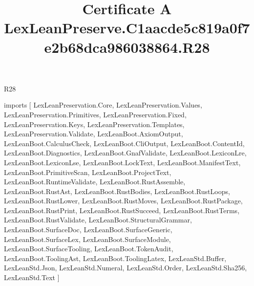 \begin{lexlean}{R28}
\title{Certificate A LexLeanPreserve.C1aacde5c819a0f7e2b68dca986038864.R28}
\begin{coremodule}
imports [
  LexLeanPreservation.Core,
  LexLeanPreservation.Values,
  LexLeanPreservation.Primitives,
  LexLeanPreservation.Fixed,
  LexLeanPreservation.Keys,
  LexLeanPreservation.Templates,
  LexLeanPreservation.Validate,
  LexLeanBoot.AxiomOutput,
  LexLeanBoot.CalculusCheck,
  LexLeanBoot.CliOutput,
  LexLeanBoot.ContentId,
  LexLeanBoot.Diagnostics,
  LexLeanBoot.GnafValidate,
  LexLeanBoot.LexiconLre,
  LexLeanBoot.LexiconLse,
  LexLeanBoot.LockText,
  LexLeanBoot.ManifestText,
  LexLeanBoot.PrimitiveScan,
  LexLeanBoot.ProjectText,
  LexLeanBoot.RuntimeValidate,
  LexLeanBoot.RustAssemble,
  LexLeanBoot.RustAst,
  LexLeanBoot.RustBodies,
  LexLeanBoot.RustLoops,
  LexLeanBoot.RustLower,
  LexLeanBoot.RustMoves,
  LexLeanBoot.RustPackage,
  LexLeanBoot.RustPrint,
  LexLeanBoot.RustSucceed,
  LexLeanBoot.RustTerms,
  LexLeanBoot.RustValidate,
  LexLeanBoot.StructuralGrammar,
  LexLeanBoot.SurfaceDoc,
  LexLeanBoot.SurfaceGeneric,
  LexLeanBoot.SurfaceLex,
  LexLeanBoot.SurfaceModule,
  LexLeanBoot.SurfaceTooling,
  LexLeanBoot.TokenAudit,
  LexLeanBoot.ToolingAst,
  LexLeanBoot.ToolingLatex,
  LexLeanStd.Buffer,
  LexLeanStd.Json,
  LexLeanStd.Numeral,
  LexLeanStd.Order,
  LexLeanStd.Sha256,
  LexLeanStd.Text
]


\end{coremodule}
\end{lexlean}
